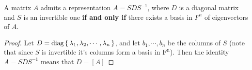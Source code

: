 \begin{thm*}
	A matrix $A$ admits a representation $A = SDS^{-1}$, where $D$ is a diagonal matrix and $S$ is an invertible one \textbf{if and only if} there exists a basis in $F^n$ of eigenvectors of $A$.
\end{thm*}

\begin{proof}
	Let $D = \text{diag}\left\{ \,\lambda_1,\lambda_2,\cdots,\lambda_n \,\right\}$, and let $b_1,\cdots,b_n$ be the columns of $S$ (note that since $S$ is invertible it's columns form a basis in $\mathrm{F^n}$). Then the identity $A = SDS^{-1}$ means that $D = [A]$
\end{proof}









